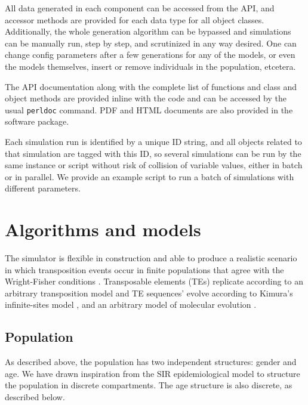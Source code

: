 \documentclass[10pt]{article}
\begin{document}
All data generated in each component can be accessed from the API, and
accessor methods are provided for each data type for all object
classes. Additionally, the whole generation algorithm can be bypassed
and simulations can be manually run, step by step, and scrutinized in
any way desired. One can change config parameters after a few
generations for any of the models, or even the models themselves,
insert or remove individuals in the population, etcetera.

The API documentation along with the complete list of functions and
class and object methods are provided inline with the code and can be
accessed by the usual \verb|perldoc| command. PDF and HTML documents
are also provided in the software package.

Each simulation run is identified by a unique ID string, and all
objects related to that simulation are tagged with this ID, so several
simulations can be run by the same instance or script without risk of
collision of variable values, either in batch or in parallel. We
provide an example script to run a batch of simulations with different
parameters.


\section{Algorithms and models}

The simulator is flexible in construction and able to produce a
realistic scenario in which transposition events occur in finite
populations that agree with the Wright-Fisher
conditions \cite{HC98}. Transposable elements (TEs) replicate according
to an arbitrary transposition model and TE sequences' evolve according
to Kimura's infinite-sites model \cite{Taj96}, and an arbitrary model
of molecular evolution \cite{Yan06}.

\subsection{Population}



As described above, the population has two independent structures:
gender and age. We have drawn inspiration from the SIR epidemiological
model to structure the population in discrete compartments. The age
structure is also discrete, as described below.
\end{document}

